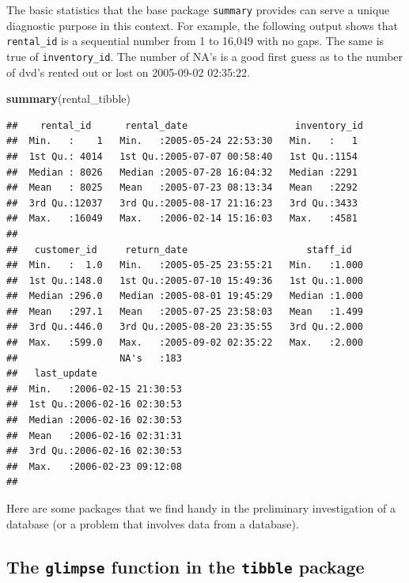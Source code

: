 \documentclass[]{book}
\newenvironment{Shaded}{\begin{snugshade}}{\end{snugshade}}
\newcommand{\KeywordTok}[1]{\textcolor[rgb]{0.13,0.29,0.53}{\textbf{#1}}}
\newcommand{\NormalTok}[1]{#1}
\theoremstyle{definition}
\theoremstyle{definition}
\theoremstyle{definition}
\theoremstyle{remark}
\begin{document}
The basic statistics that the base package \texttt{summary} provides can
serve a unique diagnostic purpose in this context. For example, the
following output shows that \texttt{rental\_id} is a sequential number
from 1 to 16,049 with no gaps. The same is true of
\texttt{inventory\_id}. The number of NA's is a good first guess as to
the number of dvd's rented out or lost on 2005-09-02 02:35:22.

\begin{Shaded}
\begin{Highlighting}[]
\KeywordTok{summary}\NormalTok{(rental_tibble)}
\end{Highlighting}
\end{Shaded}

\begin{verbatim}
##    rental_id      rental_date                   inventory_id 
##  Min.   :    1   Min.   :2005-05-24 22:53:30   Min.   :   1  
##  1st Qu.: 4014   1st Qu.:2005-07-07 00:58:40   1st Qu.:1154  
##  Median : 8026   Median :2005-07-28 16:04:32   Median :2291  
##  Mean   : 8025   Mean   :2005-07-23 08:13:34   Mean   :2292  
##  3rd Qu.:12037   3rd Qu.:2005-08-17 21:16:23   3rd Qu.:3433  
##  Max.   :16049   Max.   :2006-02-14 15:16:03   Max.   :4581  
##                                                              
##   customer_id     return_date                     staff_id    
##  Min.   :  1.0   Min.   :2005-05-25 23:55:21   Min.   :1.000  
##  1st Qu.:148.0   1st Qu.:2005-07-10 15:49:36   1st Qu.:1.000  
##  Median :296.0   Median :2005-08-01 19:45:29   Median :1.000  
##  Mean   :297.1   Mean   :2005-07-25 23:58:03   Mean   :1.499  
##  3rd Qu.:446.0   3rd Qu.:2005-08-20 23:35:55   3rd Qu.:2.000  
##  Max.   :599.0   Max.   :2005-09-02 02:35:22   Max.   :2.000  
##                  NA's   :183                                  
##   last_update                 
##  Min.   :2006-02-15 21:30:53  
##  1st Qu.:2006-02-16 02:30:53  
##  Median :2006-02-16 02:30:53  
##  Mean   :2006-02-16 02:31:31  
##  3rd Qu.:2006-02-16 02:30:53  
##  Max.   :2006-02-23 09:12:08  
## 
\end{verbatim}

Here are some packages that we find handy in the preliminary
investigation of a database (or a problem that involves data from a
database).

\hypertarget{the-glimpse-function-in-the-tibble-package}{%
\subsection{\texorpdfstring{The \texttt{glimpse} function in the
\texttt{tibble}
package}{The glimpse function in the tibble package}}\label{the-glimpse-function-in-the-tibble-package}}
\end{document}
